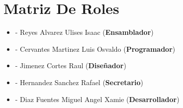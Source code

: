 \documentclass[11pt,a4paper]{article}
\begin{document}
 \pagebreak
 \section{Matriz De Roles}
 
 \begin{itemize}
 \item - Reyes Alvarez Ulises Isaac (\textbf{Ensamblador})\\
 \item - Cervantes Martinez Luis Osvaldo (\textbf{Programador})\\
 \item - Jimenez Cortes Raul (\textbf{Diseñador})\\
 \item - Hernandez Sanchez Rafael (\textbf{Secretario})\\
 \item - Diaz Fuentes Miguel Angel Xamie (\textbf{Desarrollador})\\ 
 \end{itemize}
 
\end{document}
